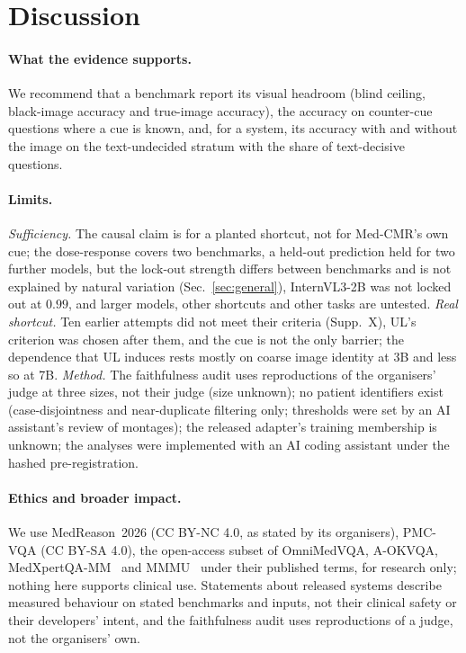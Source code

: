 \section{Discussion}
\label{sec:disc}

\paragraph{What the evidence supports.}
We recommend that a benchmark report its visual headroom (blind ceiling, black-image accuracy and true-image accuracy), the accuracy on counter-cue questions where a cue is known, and, for a system, its accuracy with and without the image on the text-undecided stratum with the share of text-decisive questions.

\paragraph{Limits.}
\emph{Sufficiency.} The causal claim is for a planted shortcut, not for Med-CMR's own cue; the dose-response covers two benchmarks, a held-out prediction held for two further models, but the lock-out strength differs between benchmarks and is not explained by natural variation (Sec.~\ref{sec:general}), InternVL3-2B was not locked out at $0.99$, and larger models, other shortcuts and other tasks are untested.
\emph{Real shortcut.} Ten earlier attempts did not meet their criteria (Supp.~X), UL's criterion was chosen after them, and the cue is not the only barrier; the dependence that UL induces rests mostly on coarse image identity at 3B and less so at 7B.
\emph{Method.} The faithfulness audit uses reproductions of the organisers' judge at three sizes, not their judge (size unknown); no patient identifiers exist (case-disjointness and near-duplicate filtering only; thresholds were set by an AI assistant's review of montages); the released adapter's training membership is unknown; the analyses were implemented with an AI coding assistant under the hashed pre-registration.

\paragraph{Ethics and broader impact.}
We use MedReason~2026 (CC BY-NC 4.0, as stated by its organisers), PMC-VQA (CC BY-SA 4.0), the open-access subset of OmniMedVQA, A-OKVQA, MedXpertQA-MM~\cite{zuo2025medxpertqa} and MMMU~\cite{yue2024mmmu} under their published terms, for research only; nothing here supports clinical use.
Statements about released systems describe measured behaviour on stated benchmarks and inputs, not their clinical safety or their developers' intent, and the faithfulness audit uses reproductions of a judge, not the organisers' own.

